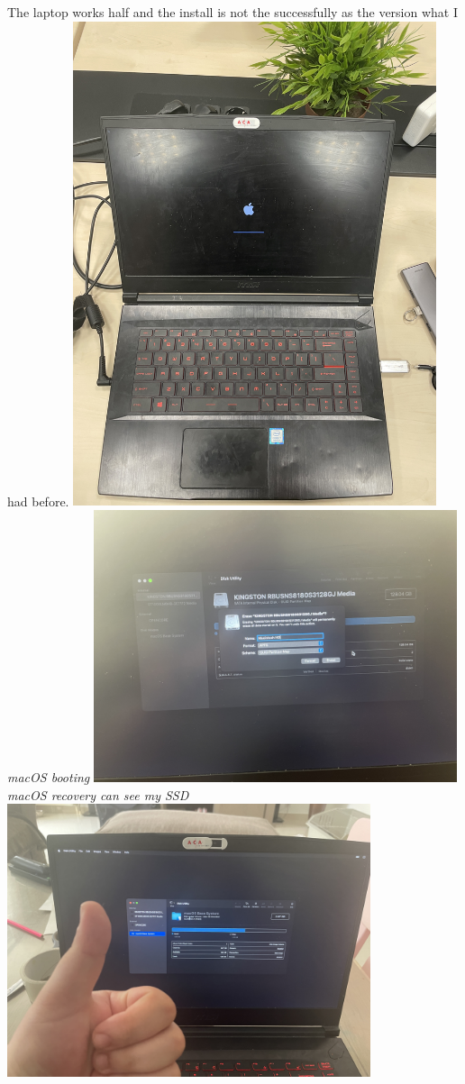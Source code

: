 \documentclass[12pt, letterpaper]{article}
\begin{document}
\hfill\break
\hfill\break
The laptop works half and the install is not the successfully as the version what I had before.
\hfill\break
\hfill\break
\includegraphics[width=0.8\textwidth]{fotos/PSP/Outcomes/macOS boot.jpeg}
\break
\emph{macOS booting}
\hfill\break
\hfill\break
\includegraphics[width=0.8\textwidth]{fotos/PSP/Outcomes/Disc utility macintsohHD.jpeg}
\break
\emph{macOS recovery can see my SSD}
\hfill\break
\hfill\break
\includegraphics[width=0.8\textwidth]{fotos/PSP/Outcomes/Installer disc utility.jpeg}
\end{document}
